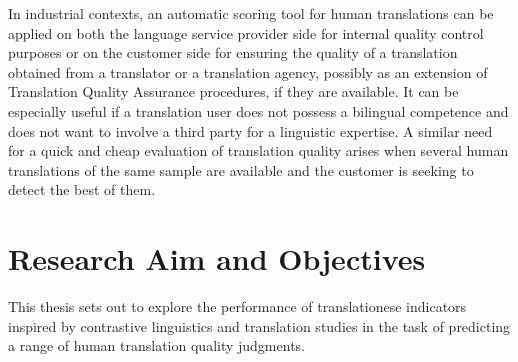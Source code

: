 In industrial contexts, an automatic scoring tool for human translations can be applied on both the language service provider side for internal quality control purposes or on the customer side for ensuring the quality of a translation obtained from a translator or a translation agency, possibly as an extension of Translation Quality Assurance procedures, if they are available. It can be especially useful if a translation user does not possess a bilingual competence and does not want to involve a third party for a linguistic expertise. A similar need for a quick and cheap evaluation of translation quality arises when several human translations of the same sample are available and the customer is seeking to detect the best of them. 

\section{\label{sec:task}Research Aim and Objectives}
This thesis sets out to explore the performance of translationese indicators inspired by contrastive linguistics and translation studies in the task of predicting a range of human translation quality judgments.

